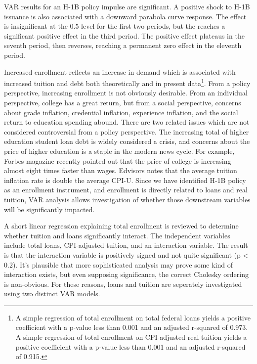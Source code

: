 \documentclass[review]{elsarticle}
\begin{document}
VAR results for an H-1B policy impulse are significant.
A positive shock to H-1B issuance is also associated with a downward parabola curve response.
The effect is insignificant at the 0.5 level for the first two periods,
but the reaches a significant positive effect in the third period.
The positive effect plateaus in the seventh period, then reverses,
reaching a permanent zero effect in the eleventh period.

Increased enrollment reflects an increase in demand which is associated with
increased tuition and debt both theoretically and in present data\footnote{
    A simple regression of total enrollment on total federal loans yields a
    positive coefficient with a p-value less than 0.001 and an adjusted r-squared
    of 0.973.
    A simple regression of total enrollment on CPI-adjusted real tuition yields a
    positive coefficient with a p-value less than 0.001 and an adjusted r-squared
    of 0.915.
}.
From a policy perspective, increasing enrollment is not obviously desirable.
From an individual perspective, college has a great return,
but from a social perspective,
concerns about grade inflation,
credential inflation,
experience inflation,
and the social return to education spending abound.
There are two related issues which are not considered controversial from a policy perspective.
The increasing total of higher education student loan debt is widely considered a crisis,
and concerns about the price of higher education is a staple in the modern news cycle.
For example, Forbes magazine recently pointed out that the price of college is increasing almost eight times faster than wages\cite{maldonado2018price}.
Edvisors notes that the average tuition inflation rate is double the average CPI-U\cite{edvisors_2019}.
Since we have identified H-1B policy as an enrollment instrument,
and enrollment is directly related to loans and real tuition,
VAR analysis allows investigation of whether those downstream variables will be significantly impacted.

A short linear regression explaining total enrollment
is reviewed to determine whether tuition and loans significantly interact.
The independent variables include total loans,
CPI-adjusted tuition,
and an interaction variable.
The result is that the interaction variable is positively signed and not quite significant (p < 0.2).
It's plausible that more sophisticated analysis may prove some kind of interaction exists,
but even supposing significance, the correct Cholesky ordering is non-obvious.
For these reasons, loans and tuition are seperately investigated using two distinct VAR models.
\end{document}

